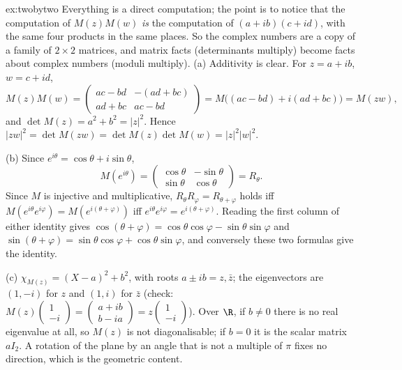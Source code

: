 \begin{solution}{ex:twobytwo}
\idea Everything is a direct computation; the point is to notice that the computation of $M(z)M(w)$ \emph{is} the computation of $(a+ib)(c+id)$, with the same four products in the same places. So the complex numbers are a copy of a family of $2\times2$ matrices, and matrix facts (determinants multiply) become facts about complex numbers (moduli multiply).
\writeup (a) Additivity is clear. For $z=a+ib$, $w=c+id$,
\[
M(z)M(w)=\begin{pmatrix}ac-bd&-(ad+bc)\\ad+bc&ac-bd\end{pmatrix}=M\big((ac-bd)+i(ad+bc)\big)=M(zw),
\]
and $\det M(z)=a^2+b^2=|z|^2$. Hence $|zw|^2=\det M(zw)=\det M(z)\det M(w)=|z|^2|w|^2$.

(b) Since $e^{i\theta}=\cos\theta+i\sin\theta$,
\[
M(e^{i\theta})=\begin{pmatrix}\cos\theta&-\sin\theta\\\sin\theta&\cos\theta\end{pmatrix}=R_\theta.
\] Since $M$ is injective and multiplicative, $R_\theta R_\varphi=R_{\theta+\varphi}$ holds iff $M(e^{i\theta}e^{i\varphi})=M(e^{i(\theta+\varphi)})$ iff $e^{i\theta}e^{i\varphi}=e^{i(\theta+\varphi)}$. Reading the first column of either identity gives $\cos(\theta+\varphi)=\cos\theta\cos\varphi-\sin\theta\sin\varphi$ and $\sin(\theta+\varphi)=\sin\theta\cos\varphi+\cos\theta\sin\varphi$, and conversely these two formulas give the identity.

(c) $\chi_{M(z)}=(X-a)^2+b^2$, with roots $a\pm ib=z,\bar z$; the eigenvectors are $(1,-i)$ for $z$ and $(1,i)$ for $\bar z$ (check: $M(z)\begin{pmatrix}1\\ -i\end{pmatrix}=\begin{pmatrix}a+ib\\ b-ia\end{pmatrix}=z\begin{pmatrix}1\\ -i\end{pmatrix}$). Over $\R$, if $b\ne0$ there is no real eigenvalue at all, so $M(z)$ is not diagonalisable; if $b=0$ it is the scalar matrix $aI_2$. A rotation of the plane by an angle that is not a multiple of $\pi$ fixes no direction, which is the geometric content.
\end{solution}

